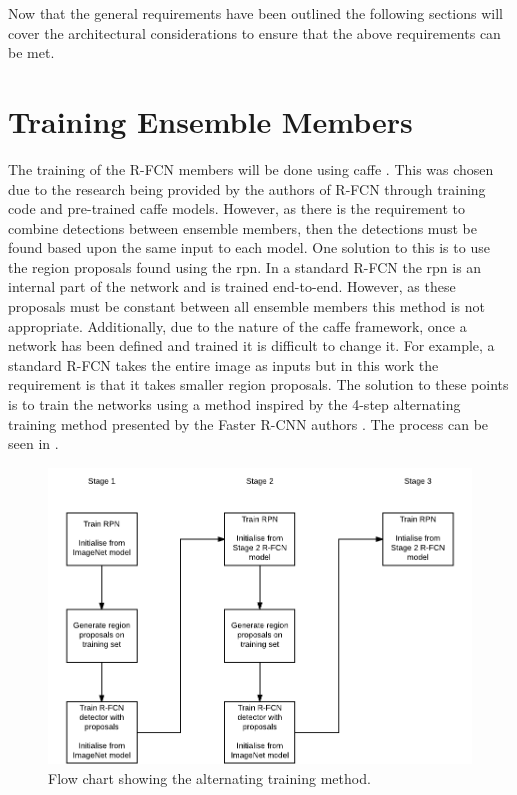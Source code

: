 Now that the general requirements have been outlined the following sections will cover the architectural considerations to ensure that the above requirements can be met.

\section{Training Ensemble Members}\label{sec:trainens}
The training of the R-FCN members will be done using \gls{caffe} \cite{caffe}. This was chosen due to the research being provided by the authors of R-FCN through training code and pre-trained \gls{caffe} models. However, as there is the requirement to combine detections between ensemble members, then the detections must be found based upon the same input to each model. One solution to this is to use the region proposals found using the \gls{rpn}. In a standard R-FCN the \gls{rpn} is an internal part of the network and is trained end-to-end. However, as these proposals must be constant between all ensemble members this method is not appropriate. Additionally, due to the nature of the \gls{caffe} framework, once a network has been defined and trained it is difficult to change it. For example, a standard R-FCN takes the entire image as inputs but in this work the requirement is that it takes smaller region proposals. The solution to these points is to train the networks using a method inspired by the 4-step alternating training method presented by the Faster R-CNN authors \cite{fasterrcnn}. The process can be seen in .

 \begin{figure}[H]
  \centering
    \includegraphics[width=1.0\textwidth]{Figs/Design/4step-crop.pdf}
      \caption{Flow chart showing the alternating training method.}
    \label{fig:4steptrain}
\end{figure}

